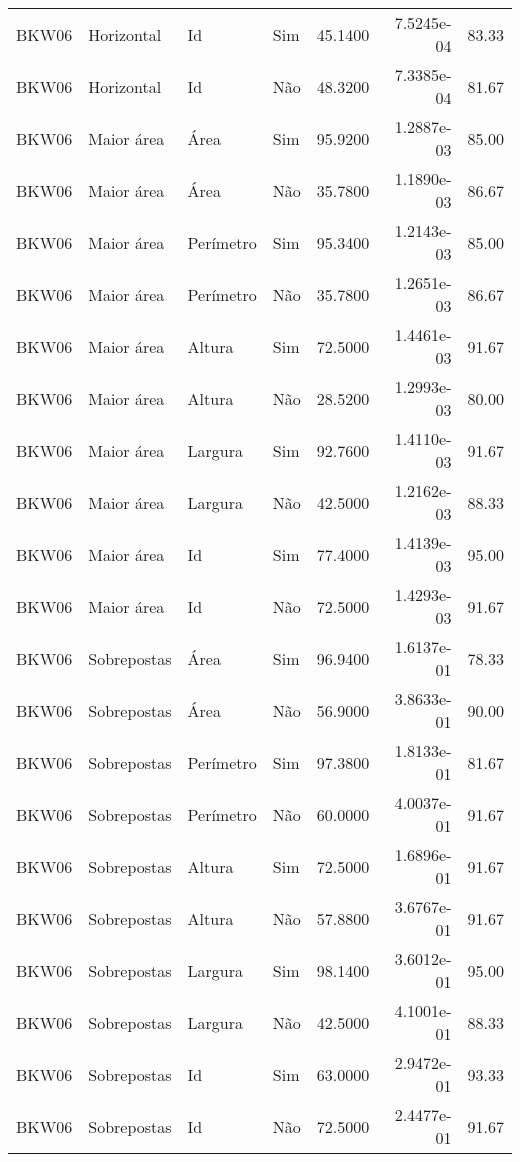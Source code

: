 \begin{tabular}{llllrrr}
    BKW06     & Horizontal  & Id        & Sim         & 45.1400      & 7.5245e-04 & 83.33    \\
    BKW06     & Horizontal  & Id        & Não         & 48.3200      & 7.3385e-04 & 81.67    \\
    BKW06     & Maior área  & Área      & Sim         & 95.9200      & 1.2887e-03 & 85.00    \\
    BKW06     & Maior área  & Área      & Não         & 35.7800      & 1.1890e-03 & 86.67    \\
    BKW06     & Maior área  & Perímetro & Sim         & 95.3400      & 1.2143e-03 & 85.00    \\
    BKW06     & Maior área  & Perímetro & Não         & 35.7800      & 1.2651e-03 & 86.67    \\
    BKW06     & Maior área  & Altura    & Sim         & 72.5000      & 1.4461e-03 & 91.67    \\
    BKW06     & Maior área  & Altura    & Não         & 28.5200      & 1.2993e-03 & 80.00    \\
    BKW06     & Maior área  & Largura   & Sim         & 92.7600      & 1.4110e-03 & 91.67    \\
    BKW06     & Maior área  & Largura   & Não         & 42.5000      & 1.2162e-03 & 88.33    \\
    BKW06     & Maior área  & Id        & Sim         & 77.4000      & 1.4139e-03 & 95.00    \\
    BKW06     & Maior área  & Id        & Não         & 72.5000      & 1.4293e-03 & 91.67    \\
    BKW06     & Sobrepostas & Área      & Sim         & 96.9400      & 1.6137e-01 & 78.33    \\
    BKW06     & Sobrepostas & Área      & Não         & 56.9000      & 3.8633e-01 & 90.00    \\
    BKW06     & Sobrepostas & Perímetro & Sim         & 97.3800      & 1.8133e-01 & 81.67    \\
    BKW06     & Sobrepostas & Perímetro & Não         & 60.0000      & 4.0037e-01 & 91.67    \\
    BKW06     & Sobrepostas & Altura    & Sim         & 72.5000      & 1.6896e-01 & 91.67    \\
    BKW06     & Sobrepostas & Altura    & Não         & 57.8800      & 3.6767e-01 & 91.67    \\
    BKW06     & Sobrepostas & Largura   & Sim         & 98.1400      & 3.6012e-01 & 95.00    \\
    BKW06     & Sobrepostas & Largura   & Não         & 42.5000      & 4.1001e-01 & 88.33    \\
    BKW06     & Sobrepostas & Id        & Sim         & 63.0000      & 2.9472e-01 & 93.33    \\
    BKW06     & Sobrepostas & Id        & Não         & 72.5000      & 2.4477e-01 & 91.67    \\
    \hline
\end{tabular}